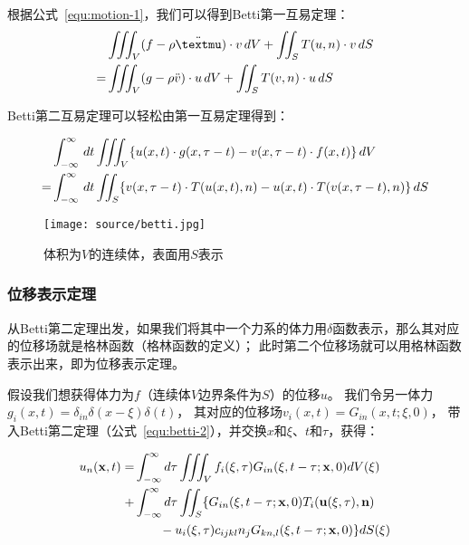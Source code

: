 根据公式~\ref{equ:motion-1}，我们可以得到Betti第一互易定理：
\begin{align}
    & \iiint\nolimits_V (f - \rho {\ddot \mu})\cdot v \,dV + \iint\nolimits_S T(u,n) \cdot v \,dS \notag \\
    = & \iiint\nolimits_V (g - \rho {\ddot v})\cdot u \,dV + \iint\nolimits_S T(v,n) \cdot u \,dS 
    \label{equ:betti-1}
\end{align}

Betti第二互易定理可以轻松由第一互易定理得到：

\begin{align}
    & \int\nolimits_{-\infty}^\infty \,dt \iiint\nolimits_V \{ u(x,t) \cdot g(x,\tau-t) -v(x,\tau-t) \cdot f(x,t) \} \,dV  \notag \\
    = & \int\nolimits_{-\infty}^\infty \,dt \iint\nolimits_S \{ v(x,\tau-t) \cdot T(u(x,t),n) - u(x,t) \cdot T(v(x,\tau-t),n) \}  \,dS
    \label{equ:betti-2}
\end{align}

\begin{figure}[h]
    \centering
    \texttt{[image: source/betti.jpg]}
    \caption{体积为$V$的连续体，表面用$S$表示}
    \label{fig:betti}
\end{figure}

\subsubsection{位移表示定理}

从Betti第二定理出发，如果我们将其中一个力系的体力用$\delta$函数表示，那么其对应的位移场就是格林函数（格林函数的定义）；
此时第二个位移场就可以用格林函数表示出来，即为位移表示定理。

假设我们想获得体力为$f$（连续体$V$边界条件为$S$）的位移$u$。
我们令另一体力$g_i(x,t)=\delta_{in} \delta(x-\xi) \delta(t)$，
其对应的位移场$v_i(x,t)=G_{in}(x,t;\xi,0)$，
带入Betti第二定理（公式~\ref{equ:betti-2}），并交换$x$和$\xi$、$t$和$\tau$，获得：

\begin{align} 
    u_{n}(\mathbf{x}, t) = & \int\nolimits_{-\infty}^{\infty} d \tau \iiint\nolimits_{V} f_{i}(\xi, \tau) G_{i n}(\xi, t-\tau ; \mathbf{x}, 0) d V(\xi) \notag \\ 
     + & \int\nolimits_{-\infty}^{\infty} d \tau \iint\nolimits_{S} \{ G_{i n}(\xi, t-\tau ; \mathbf{x}, 0) T_{i}(\mathbf{u}(\xi, \tau), \mathbf{n}) \notag \\ 
     & \qquad -  u_{i}(\xi, \tau) c_{i j k l} n_{j} G_{k n, l}(\xi, t-\tau ; \mathbf{x}, 0) \} d S(\xi) 
\end{align}

